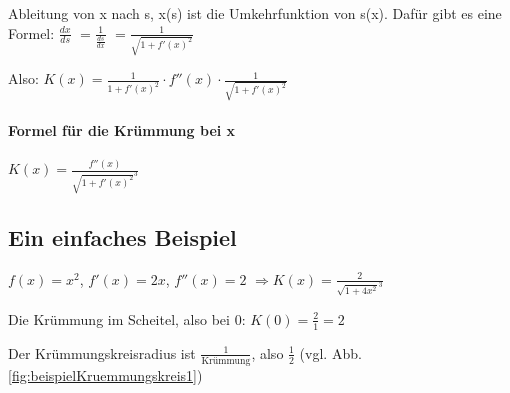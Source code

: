Ableitung von x nach s, x(s) ist die Umkehrfunktion von s(x). Dafür gibt es eine Formel: 
$ \frac{dx}{ds} $
$= \frac{1}{\frac{ds}{dx}} $
$= \frac{1}{\sqrt{1 + f'(x)^2}}$

Also: $K(x) = \frac{1}{1+f'(x)^2} \cdot f''(x) \cdot \frac{1}{\sqrt{1 + f'(x)^2}} $\\

\paragraph{Formel für die Krümmung bei x}
$ K(x) = \frac{f''(x)}{\sqrt{1+f'(x)^2}^3} $

\subsection{Ein einfaches Beispiel}
$f(x) = x^2$, $f'(x) = 2x$, $f''(x) = 2$
$\Rightarrow K(x) = \frac{2}{\sqrt{1+4x^2}^3}$ 

Die Krümmung im Scheitel, also bei 0: 
$ K(0) = \frac{2}{1} = 2$

Der Krümmungskreisradius ist $\frac{1}{\textrm{Krümmung}}$, also $\frac{1}{2}$ (vgl. Abb. \ref{fig:beispielKruemmungskreis1})
